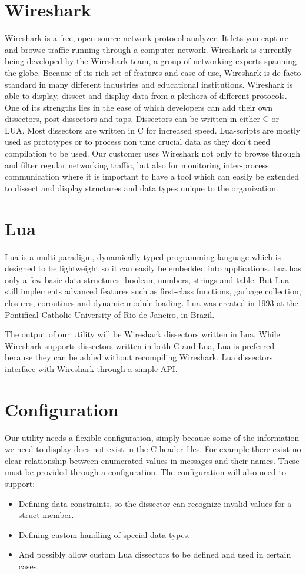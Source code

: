 \section{Wireshark}
Wireshark is a free, open source network protocol analyzer. It lets you capture
and browse traffic running through a computer network. Wireshark is currently
being developed by the Wireshark team, a group of networking experts spanning
the globe. Because of its rich set of features and ease of use, Wireshark is de
facto standard in many different industries and educational institutions.
Wireshark is able to display, dissect and display data from a plethora of
different protocols. One of its strengths lies in the ease of which developers
can add their own dissectors, post-dissectors and taps. Dissectors can be
written in either C or LUA. Most dissectors are written in C for increased
speed. Lua-scripts are mostly used as prototypes or to process non time crucial
data as they don’t need compilation to be used. Our customer uses Wireshark not
only to browse through and filter regular networking traffic, but also for
monitoring inter-process communication where it is important to have a tool
which can easily be extended to dissect and display structures and data types
unique to the organization.

\section{Lua}
Lua is a multi-paradigm, dynamically typed programming language which is
designed to be lightweight so it can easily be embedded into applications.
Lua has only a few basic data structures: boolean, numbers, strings and table.
But Lua still implements advanced features such as first-class functions,
garbage collection, closures, coroutines and dynamic module loading. Lua was
created in 1993 at the Pontifical Catholic University of Rio de Janeiro, in
Brazil.

The output of our utility will be Wireshark dissectors written in Lua. While
Wireshark supports dissectors written in both C and Lua, Lua is preferred
because they can be added without recompiling Wireshark. Lua dissectors
interface with Wireshark through a simple API.

\section{Configuration}
Our utility needs a flexible configuration, simply because some of the
information we need to display does not exist in the C header files. For
example there exist no clear relationship between enumerated values in messages
and their names. These must be provided through a configuration. The
configuration will also need to support:
\begin{itemize}
	\item Defining data constraints, so the dissector can recognize invalid
		values for a struct member.
	\item Defining custom handling of special data types.
	\item  And possibly allow custom Lua dissectors to be defined and used in
		certain cases.
\end{itemize}

